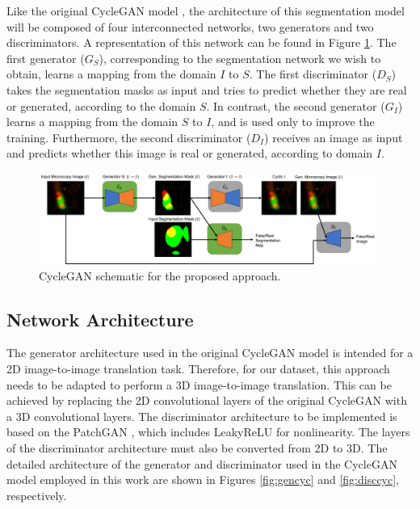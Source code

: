 Like the original CycleGAN model \cite{cycleGAN:original}, the architecture of this segmentation model will be composed of four interconnected networks, two generators and two discriminators. A representation of this network can be found in Figure \ref{fig:diagrama}. The first generator ($G_S$), corresponding to the segmentation network we wish to obtain, learns a mapping from the domain $I$ to $S$. The first discriminator ($D_S$) takes the segmentation masks as input and tries to predict whether they are real or generated, according to the domain $S$. In contrast, the second generator ($G_I$) learns a mapping from the domain $S$ to $I$, and is used only to improve the training. Furthermore, the second discriminator ($D_I$) receives an image as input and predicts whether this image is real or generated, according to domain $I$.

\begin{figure}[!htb]
  \centering
  \includegraphics[width=0.99\textwidth]{Images/diagrama.jpg}
  \caption[CycleGAN schematic for the proposed approach.]{CycleGAN schematic for the proposed approach.}
  \label{fig:diagrama}
\end{figure}


\subsection*{Network Architecture}

The generator architecture used in the original CycleGAN model is intended for a 2D image-to-image translation task. Therefore, for our dataset, this approach needs to be adapted to perform a 3D image-to-image translation. This can be achieved by replacing the 2D convolutional layers of the original CycleGAN with a 3D convolutional layers.  The discriminator architecture to be implemented is based on the PatchGAN \cite{isola2018imagetoimage}, which includes LeakyReLU for nonlinearity. The layers of the discriminator architecture must also be converted from 2D to 3D. The detailed architecture of the generator and discriminator used in the CycleGAN model employed in this work are shown in Figures \ref{fig:gencyc} and \ref{fig:disccyc}, respectively.

